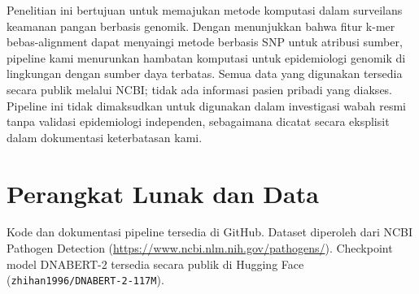 \documentclass{article}
\begin{document}
Penelitian ini bertujuan untuk memajukan metode komputasi dalam surveilans
keamanan pangan berbasis genomik. Dengan menunjukkan bahwa fitur k-mer
bebas-alignment dapat menyaingi metode berbasis SNP untuk atribusi sumber,
pipeline kami menurunkan hambatan komputasi untuk epidemiologi genomik di
lingkungan dengan sumber daya terbatas. Semua data yang digunakan tersedia
secara publik melalui NCBI; tidak ada informasi pasien pribadi yang diakses.
Pipeline ini tidak dimaksudkan untuk digunakan dalam investigasi wabah resmi
tanpa validasi epidemiologi independen, sebagaimana dicatat secara eksplisit
dalam dokumentasi keterbatasan kami.

\section*{Perangkat Lunak dan Data}

Kode dan dokumentasi pipeline tersedia di GitHub. Dataset diperoleh dari
NCBI Pathogen Detection (\url{https://www.ncbi.nlm.nih.gov/pathogens/}).
Checkpoint model DNABERT-2 tersedia secara publik di Hugging Face
(\texttt{zhihan1996/DNABERT-2-117M}).




\end{document}
